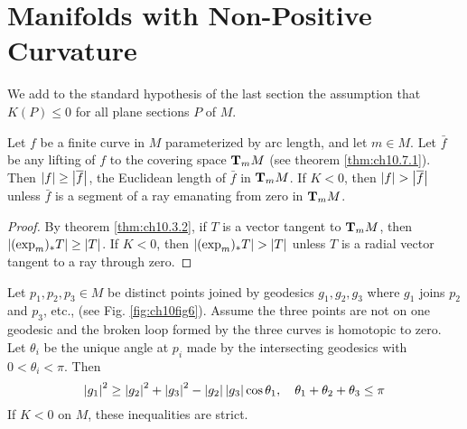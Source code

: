 \documentclass[../main]{subfiles}
\begin{document}
\section{Manifolds with Non-Positive Curvature}\label{ch10:s8}

We add to the standard hypothesis of the last section the assumption that $K(P)\le0$ for all plane sections $P$ of $M$.



\begin{lemma} \label{lem:ch10.8.1}
Let $f$ be a finite curve in $M$ parameterized by arc length, and let $m\in M$. Let $\bar f$ be any lifting of $f$ to the covering space $\ts Mm$ (see theorem \ref{thm:ch10.7.1}). Then $\norm f\ge\norm{\bar f}$, the Euclidean length of $\bar f$ in $\ts Mm$. If $K<0$, then $\norm f>\norm{\bar f}$ unless $\bar f$ is a segment of a ray emanating from zero in $\ts Mm$.
\end{lemma}

\begin{proof}
By theorem \ref{thm:ch10.3.2}, if $T$ is a vector tangent to $\ts Mm$, then \newline $\norm{(\exp_m)_*T}\ge\norm T$. If $K<0$, then $\norm{(\exp_m)_*T}>\norm T$ unless $T$ is a radial vector tangent to a ray through zero.
\end{proof}



\begin{theorem} \label{thm:ch10.8.2}
Let $p_1,p_2,p_3\in M$ be distinct points joined by geodesics $g_1,g_2,g_3$ where $g_1$ joins $p_2$ and $p_3$, etc., (see Fig. \ref{fig:ch10fig6}). Assume the three points are not on one geodesic and the broken loop formed by the three curves is homotopic to zero. Let $\theta_i$ be the unique angle at $p_i$ made by the intersecting geodesics with $0<\theta_i<\pi$. Then
\[\norm{g_1}^2 \ge \norm{g_2}^2 + \norm{g_3}^2 - \norm{g_2}\norm{g_3}\cos\theta_1,
\quad \theta_1+\theta_2+\theta_3\le\pi\]
If $K<0$ on $M$, these inequalities are strict.
\end{theorem}
\end{document}
